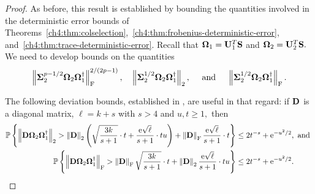 \begin{proof}
\noindent
As before, this result is established by bounding the quantities involved in the deterministic 
error bounds of 
Theorems~\ref{ch4:thm:colselection},~\ref{ch4:thm:frobenius-deterministic-error},
 and~\ref{ch4:thm:trace-deterministic-error}. Recall that $\mathbf{\Omega}_1 = \mathbf{U}_1^T
\mathbf{S}$ and $\mathbf{\Omega}_2 = \mathbf{U}_2^T \mathbf{S}.$ We need to develop bounds
on the quantities
\[
 \left\|\mathbf{\Sigma}_2^{p-1/2} \mathbf{\Omega}_2 \mathbf{\Omega}_1^\dagger\right\|_\mathrm{F}^{2/(2p-1)}, \quad \left\|\mathbf{\Sigma}_2^{1/2} \mathbf{\Omega}_2 \mathbf{\Omega}_1^\dagger\right\|_2,
 \quad \text{ and } \quad \left\|\mathbf{\Sigma}_2^{1/2} \mathbf{\Omega}_2 \mathbf{\Omega}_1^\dagger\right\|_\mathrm{F}.
\]

The following deviation bounds, 
 established in \cite[Section 10]{HMT11}, are useful in that regard: 
 if $\mathbf{D}$ is a diagonal matrix, $\ell = k + s$ with $s > 4$ and $u,t \geq 1,$ then
 \begin{align}
  \Prob{\TNorm{\matD \matOmega_2 \matOmega_1^\pinv} > \TNorm{\matD} \left( \sqrt{\frac{3k}{s+1}} \cdot t 
        + \frac{\e \sqrt{\ell}}{s+1} \cdot tu \right) + \FNorm{\matD} \frac{\e \sqrt{\ell} }{s+1} \cdot t } & 
        \leq 2t^{-s} + \e^{-u^2/2}, \text{ and } \notag \\
%        
 \Prob{\FNorm{\matD \matOmega_2 \matOmega_1^\pinv} > \FNorm{\matD} \sqrt{\frac{3k}{s+1}} \cdot t 
       + \TNorm{\matD} \frac{\e \sqrt{\ell}}{s+1}\cdot tu} & 
       \leq 2t^{-s} + \e^{-u^2/2}.
\label{ch4:eqn:gaussian-sampling-deviation-bounds}
\end{align}


\end{proof}
